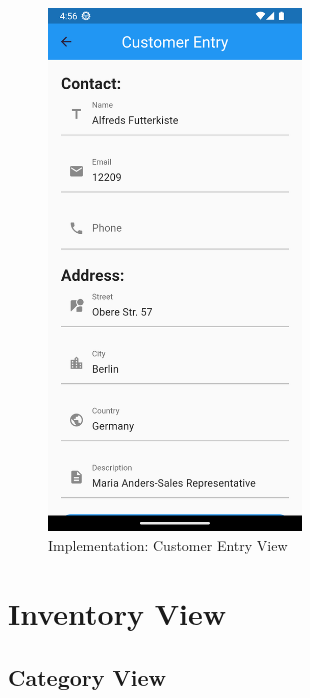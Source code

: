 \documentclass[../thesis.tex]{subfiles}
\begin{document}
\begin{figure}[H]
    \centering
    \includegraphics[width=0.60\textwidth]{images/CustomerSreen_EntryForm.png}
    \caption{Implementation: Customer Entry View}
    \label{fig:CustomerSreen_EntryForm}
\end{figure}


\section{Inventory View}
\subsection{Category View}
\end{document}
